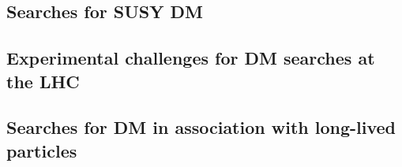 \subsection{Searches for SUSY DM}
\label{sec:results_SUSYSearches}

\subsection{Experimental challenges for DM searches at the LHC}
\label{sec:experimentalChallenges}


\subsection{Searches for DM in association with long-lived particles}
\label{sec:results_LLPSearches}


%
%
%
%
%


%
%
%
%
%


